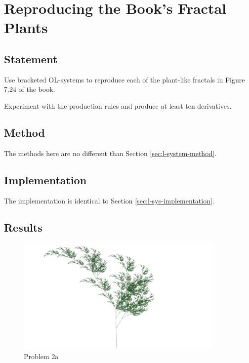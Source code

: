 \section{Reproducing the Book's Fractal Plants}

\subsection{Statement}
Use bracketed OL-systems to reproduce each of the plant-like fractals in Figure 7.24 of the book.

Experiment with the production rules and produce at least ten derivatives.

\subsection{Method}
The methods here are no different than Section \ref{sec:l-system-method}.

\subsection{Implementation}
The implementation is identical to Section \ref{sec:l-sys-implementation}.

\subsection{Results}\label{sec:p2-results}

\begin{figure}[H]
\centering
\noindent\includegraphics[width=0.90\textwidth]{figures/L-systems/a}
\caption{Problem 2a}
\label{fig:prob2a}
\end{figure}

